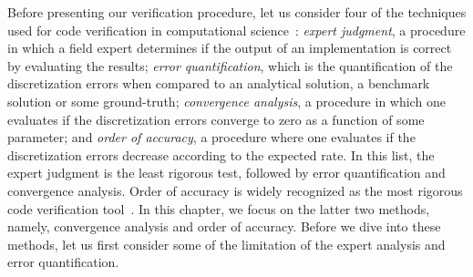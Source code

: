 Before presenting our verification procedure, let us consider four of
the techniques used for code verification in computational
science~\cite{Roy2005}: \emph{expert judgment}, a procedure in which a
field expert determines if the output of an implementation is correct
by evaluating the results; \emph{error quantification}, which is the
quantification of the discretization errors when compared to an
analytical solution, a benchmark solution or some ground-truth;
\emph{convergence analysis}, a procedure in which one evaluates if the
discretization errors converge to zero as a function of some
parameter; and \emph{order of accuracy}, a procedure where one
evaluates if the discretization errors decrease according to the
expected rate. In this list, the expert judgment is the least rigorous
test, followed by error quantification and convergence analysis. 
Order of accuracy is widely recognized as the most rigorous code
verification tool~\cite{babuska04, KnuppSalari02, roach98,
  Roy2005}. In this chapter, we focus on the latter two methods, namely,
convergence analysis and order of accuracy. Before we dive into these
methods, let us first consider some of the limitation of the expert
analysis and error quantification.

